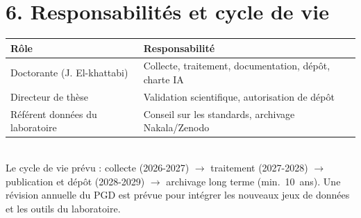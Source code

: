 \documentclass[11pt,a4paper]{article}
\begin{document}
\section*{6. Responsabilités et cycle de vie}
\begin{tabularx}{\linewidth}{lX}
\toprule
\textbf{Rôle} & \textbf{Responsabilité} \\
\midrule
Doctorante (J. El-khattabi) & Collecte, traitement, documentation, dépôt, charte IA \\
Directeur de thèse & Validation scientifique, autorisation de dépôt \\
Référent données du laboratoire & Conseil sur les standards, archivage Nakala/Zenodo \\
\bottomrule
\end{tabularx}\\[2pt]
Le cycle de vie prévu : collecte (2026-2027) $\rightarrow$ traitement (2027-2028)
$\rightarrow$ publication et dépôt (2028-2029) $\rightarrow$ archivage long terme
(min.~10~ans). Une révision annuelle du PGD est prévue pour intégrer les nouveaux
jeux de données et les outils du laboratoire.
\end{document}
